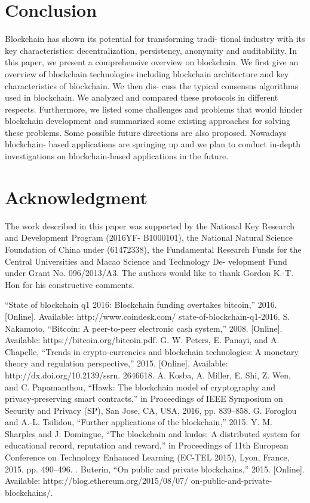 \documentclass[conference]{IEEEtran}
\begin{document}
\section{Conclusion}
Blockchain has shown its potential for transforming tradi-
tional industry with its key characteristics: decentralization,
persistency, anonymity and auditability. In this paper, we
present a comprehensive overview on blockchain. We first give
an overview of blockchain technologies including blockchain
architecture and key characteristics of blockchain. We then dis-
cuss the typical consensus algorithms used in blockchain. We
analyzed and compared these protocols in different respects.
Furthermore, we listed some challenges and problems that
would hinder blockchain development and summarized some
existing approaches for solving these problems. Some possible
future directions are also proposed. Nowadays blockchain-
based applications are springing up and we plan to conduct
in-depth investigations on blockchain-based applications in the
future.

\section*{Acknowledgment}

The work described in this paper was supported by the
National Key Research and Development Program (2016YF-
B1000101), the National Natural Science Foundation of China
under (61472338), the Fundamental Research Funds for the
Central Universities and Macao Science and Technology De-
velopment Fund under Grant No. 096/2013/A3. The authors
would like to thank Gordon K.-T. Hon for his constructive
comments.


\begin{thebibliography}{00}
 “State of blockchain q1 2016: Blockchain funding overtakes
bitcoin,” 2016. [Online]. Available: http://www.coindesk.com/
state-of-blockchain-q1-2016.
 S. Nakamoto, “Bitcoin: A peer-to-peer electronic cash system,” 2008.
[Online]. Available: https://bitcoin.org/bitcoin.pdf.
 G. W. Peters, E. Panayi, and A. Chapelle, “Trends in crypto-currencies
and blockchain technologies: A monetary theory and regulation
perspective,” 2015. [Online]. Available: http://dx.doi.org/10.2139/ssrn.
2646618.
 A. Kosba, A. Miller, E. Shi, Z. Wen, and C. Papamanthou, “Hawk:
The blockchain model of cryptography and privacy-preserving smart
contracts,” in Proceedings of IEEE Symposium on Security and Privacy
(SP), San Jose, CA, USA, 2016, pp. 839–858.
 G. Foroglou and A.-L. Tsilidou, “Further applications of the blockchain,”
2015.
 Y. M. Sharples and J. Domingue, “The blockchain and kudos: A distributed
system for educational record, reputation and reward,” in Proceedings of
11th European Conference on Technology Enhanced Learning (EC-TEL
2015), Lyon, France, 2015, pp. 490–496.
 . Buterin, “On public and private blockchains,”
2015. [Online]. Available: https://blog.ethereum.org/2015/08/07/
on-public-and-private-blockchains/.
\end{thebibliography}
\vspace{12pt}
\end{document}
